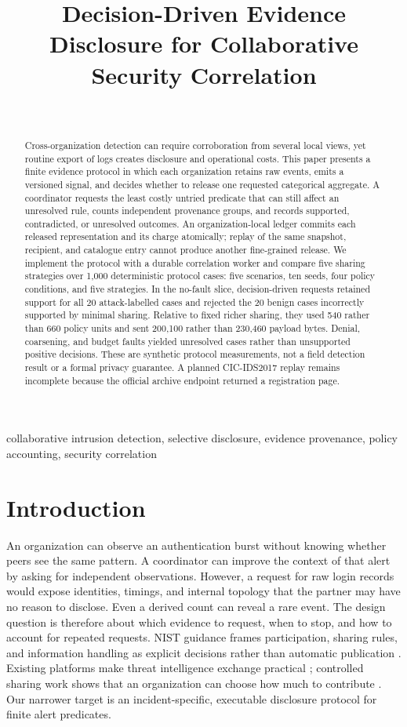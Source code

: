 \documentclass[conference,letterpaper]{IEEEtran}
\title{Decision-Driven Evidence Disclosure for Collaborative Security Correlation}
\author{\IEEEauthorblockN{Ananay Srivastava, Jitendra Singh, Manik Bhardwaj, Ashish Jain, Mukunj Singh}\\
\IEEEauthorblockA{Department of Computer Science and Engineering, Sharda University, India}}
\begin{document}
\maketitle
\begin{abstract}
Cross-organization detection can require corroboration from several local views, yet routine export of logs creates disclosure and operational costs. This paper presents a finite evidence protocol in which each organization retains raw events, emits a versioned signal, and decides whether to release one requested categorical aggregate. A coordinator requests the least costly untried predicate that can still affect an unresolved rule, counts independent provenance groups, and records supported, contradicted, or unresolved outcomes. An organization-local ledger commits each released representation and its charge atomically; replay of the same snapshot, recipient, and catalogue entry cannot produce another fine-grained release. We implement the protocol with a durable correlation worker and compare five sharing strategies over 1,000 deterministic protocol cases: five scenarios, ten seeds, four policy conditions, and five strategies. In the no-fault slice, decision-driven requests retained support for all 20 attack-labelled cases and rejected the 20 benign cases incorrectly supported by minimal sharing. Relative to fixed richer sharing, they used 540 rather than 660 policy units and sent 200,100 rather than 230,460 payload bytes. Denial, coarsening, and budget faults yielded unresolved cases rather than unsupported positive decisions. These are synthetic protocol measurements, not a field detection result or a formal privacy guarantee. A planned CIC-IDS2017 replay remains incomplete because the official archive endpoint returned a registration page.
\end{abstract}
\begin{IEEEkeywords}
collaborative intrusion detection, selective disclosure, evidence provenance, policy accounting, security correlation
\end{IEEEkeywords}

\section{Introduction}
An organization can observe an authentication burst without knowing whether peers see the same pattern. A coordinator can improve the context of that alert by asking for independent observations. However, a request for raw login records would expose identities, timings, and internal topology that the partner may have no reason to disclose. Even a derived count can reveal a rare event. The design question is therefore about which evidence to request, when to stop, and how to account for repeated requests. NIST guidance frames participation, sharing rules, and information handling as explicit decisions rather than automatic publication \cite{nist150}. Existing platforms make threat intelligence exchange practical \cite{misp}; controlled sharing work shows that an organization can choose how much to contribute \cite{freudiger}. Our narrower target is an incident-specific, executable disclosure protocol for finite alert predicates.
\end{document}
